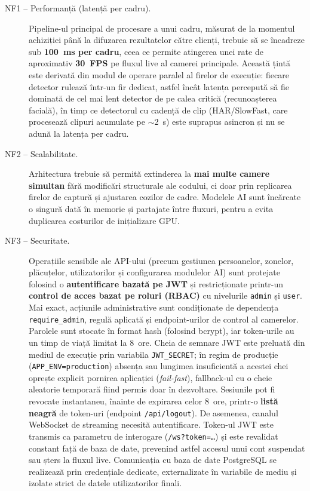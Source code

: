 \documentclass[../../main.tex]{subfiles}
\begin{document}
\begin{description}
    \item[NF1 -- Performanță (latență per cadru).] Pipeline-ul principal de procesare a unui cadru, măsurat de la momentul achiziției până la difuzarea rezultatelor către clienți, trebuie să se încadreze sub \textbf{100~ms per cadru}, ceea ce permite atingerea unei rate de aproximativ \textbf{30~FPS} pe fluxul live al camerei principale. Această țintă este derivată din modul de operare paralel al firelor de execuție: fiecare detector rulează într-un fir dedicat, astfel încât latența percepută să fie dominată de cel mai lent detector de pe calea critică (recunoașterea facială), în timp ce detectorul cu cadență de clip (HAR/SlowFast, care procesează clipuri acumulate pe $\sim$2~s) este suprapus asincron și nu se adună la latența per cadru.

    \item[NF2 -- Scalabilitate.] Arhitectura trebuie să permită extinderea la \textbf{mai multe camere simultan} fără modificări structurale ale codului, ci doar prin replicarea firelor de captură și ajustarea cozilor de cadre. Modelele AI sunt încărcate o singură dată în memorie și partajate între fluxuri, pentru a evita duplicarea costurilor de inițializare GPU.

    \item[NF3 -- Securitate.] Operațiile sensibile ale API-ului (precum gestiunea persoanelor, zonelor, plăcuțelor, utilizatorilor și configurarea modulelor AI) sunt protejate folosind o \textbf{autentificare bazată pe JWT} și restricționate printr-un \textbf{control de acces bazat pe roluri (RBAC)} cu nivelurile \texttt{admin} și \texttt{user}. Mai exact, acțiunile administrative sunt condiționate de dependența \texttt{require\_admin}, regulă aplicată și endpoint-urilor de control al camerelor. Parolele sunt stocate în format hash (folosind bcrypt), iar token-urile au un timp de viață limitat la 8~ore. Cheia de semnare JWT este preluată din mediul de execuție prin variabila \texttt{JWT\_SECRET}; în regim de producție (\texttt{APP\_ENV=production}) absența sau lungimea insuficientă a acestei chei oprește explicit pornirea aplicației (\emph{fail-fast}), fallback-ul cu o cheie aleatorie temporară fiind permis doar în dezvoltare. Sesiunile pot fi revocate instantaneu, înainte de expirarea celor 8~ore, printr-o \textbf{listă neagră} de token-uri (endpoint \texttt{/api/logout}). De asemenea, canalul WebSocket de streaming necesită autentificare. Token-ul JWT este transmis ca parametru de interogare (\texttt{/ws?token=\dots}) și este revalidat constant față de baza de date, prevenind astfel accesul unui cont suspendat sau șters la fluxul live. Comunicația cu baza de date PostgreSQL se realizează prin credențiale dedicate, externalizate în variabile de mediu și izolate strict de datele utilizatorilor finali.


\end{description}
\end{document}
